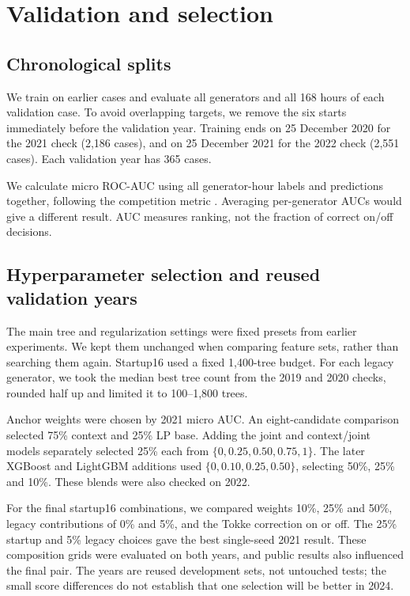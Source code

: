 \documentclass[a4paper,11pt]{article}
\begin{document}
\section{Validation and selection}
\subsection*{Chronological splits}
We train on earlier cases and evaluate all generators and all 168 hours of each validation case. To avoid overlapping targets, we remove the six starts immediately before the validation year. Training ends on 25 December 2020 for the 2021 check (2,186 cases), and on 25 December 2021 for the 2022 check (2,551 cases). Each validation year has 365 cases.

We calculate micro ROC-AUC using all generator-hour labels and predictions together, following the competition metric \cite{task}. Averaging per-generator AUCs would give a different result. AUC measures ranking, not the fraction of correct on/off decisions.

\subsection*{Hyperparameter selection and reused validation years}
The main tree and regularization settings were fixed presets from earlier experiments. We kept them unchanged when comparing feature sets, rather than searching them again. Startup16 used a fixed 1,400-tree budget. For each legacy generator, we took the median best tree count from the 2019 and 2020 checks, rounded half up and limited it to 100--1,800 trees.

Anchor weights were chosen by 2021 micro AUC. An eight-candidate comparison selected 75\% context and 25\% LP base. Adding the joint and context/joint models separately selected 25\% each from $\{0,0.25,0.50,0.75,1\}$. The later XGBoost and LightGBM additions used $\{0,0.10,0.25,0.50\}$, selecting 50\%, 25\% and 10\%. These blends were also checked on 2022.

For the final startup16 combinations, we compared weights 10\%, 25\% and 50\%, legacy contributions of 0\% and 5\%, and the Tokke correction on or off. The 25\% startup and 5\% legacy choices gave the best single-seed 2021 result. These composition grids were evaluated on both years, and public results also influenced the final pair. The years are reused development sets, not untouched tests; the small score differences do not establish that one selection will be better in 2024.
\end{document}
